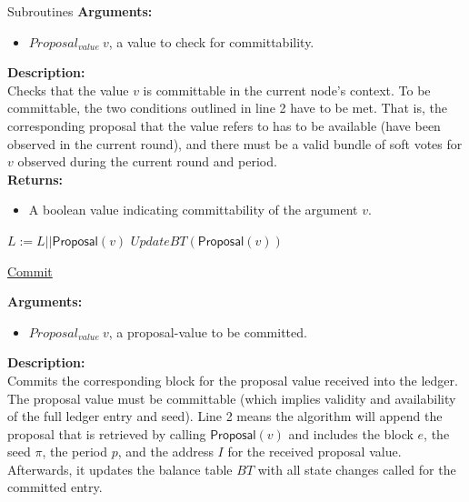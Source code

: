 \documentclass[10pt,a4paper]{article}
\begin{document}
\begin{section}{Subroutines}
\noindent \textbf{Arguments:}
\begin{itemize}
    \item $Proposal_{value} \ v$, a value to check for committability.
  \end{itemize}

\noindent \textbf{Description:}\\
Checks that the value $v$ is committable in the current node's context.
To be committable, the two conditions outlined in line 2 have to be met.
That is, the corresponding proposal that the value refers to has to be
available (have been observed in the current round), and there must
be a valid bundle of soft votes for $v$ observed during the current round and
period. \\

\noindent \textbf{Returns:}
\begin{itemize}
    \item A boolean value indicating committability of the argument $v$.
  \end{itemize}


\begin{algorithm}[H]
    \begin{algorithmic}[1]

    \State $L := L || \mathsf{Proposal}(v)$
    \State $UpdateBT(\mathsf{Proposal}(v))$

    \EndFunction
    \end{algorithmic}
    \caption{\underline{Commit}}
\end{algorithm}


\noindent \textbf{Arguments:}
\begin{itemize}
    \item $Proposal_{value} \ v$, a proposal-value to be committed.
  \end{itemize}

\noindent \textbf{Description:}\\
Commits the corresponding block for the proposal value received into the ledger.
The proposal value must be committable (which implies validity and availability of the full
ledger entry and seed).
Line 2 means the algorithm will append the proposal that is retrieved by calling $\mathsf{Proposal}(v)$ and
includes the block $e$, the seed $\pi$, the period $p$, and the address $I$ for the received proposal value.
Afterwards, it updates the balance table $BT$ with all state changes called for the committed entry.


\end{section}
\end{document}
